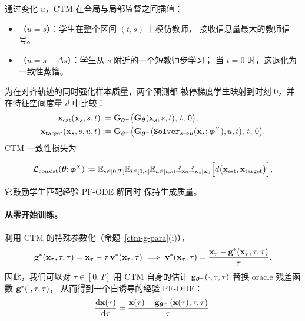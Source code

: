 通过变化 $u$，CTM 在全局与局部监督之间插值：
\begin{itemize}
    \item {}（$u = s$）：学生在整个区间 $(t,s)$ 上模仿教师，
    接收信息量最大的教师信号。
    \item {}（$u = s - \Delta s$）：学生从 $s$ 附近的一个短教师步学习；
    当 $t=0$ 时，这退化为一致性蒸馏。
\end{itemize}

为在对齐轨迹的同时强化样本质量，两个预测都
被停梯度学生映射到时刻 $0$，并在特征空间度量 $d$ 中比较：
\begin{align*}
{\mathbf{x}}_{\mathrm{est}}({\mathbf{x}}_s,s,t) &:= \mathbf{G}_{\bm{\theta}^-} \big(\mathbf{G}_{\bm{\theta}}({\mathbf{x}}_s,s,t),\, t,\, 0\big),\\
{\mathbf{x}}_{\mathrm{target}}({\mathbf{x}}_s,s,u,t) &:= \mathbf{G}_{\bm{\theta}^-} \big(
\mathbf{G}_{\bm{\theta}^-}(\mathtt{Solver}_{s\to u}({\mathbf{x}}_s;\bm{\phi}^\times), u, t),\, t,\, 0\big).
\end{align*}
CTM 一致性损失为
\begin{mdframed}
    \begin{align}\label{eq:ctm-consist-distill}
\begin{aligned}
\mathcal{L}_{\mathrm{consist}}(\bm{\theta}; \bm{\phi}^\times)
:=
\mathbb{E}_{s \in [0,T]}\mathbb{E}_{t \in [0,s]}\mathbb{E}_{u \in [t,s)}
\mathbb{E}_{{\mathbf{x}}_0}\mathbb{E}_{{\mathbf{x}}_s |{\mathbf{x}}_0}
\Big[ d\big({\mathbf{x}}_{\mathrm{est}}, {\mathbf{x}}_{\mathrm{target}}\big) \Big],
\end{aligned}
\end{align}
\end{mdframed}
它鼓励学生匹配经验 PF-ODE 解同时
保持生成质量。


\paragraph{从零开始训练。}
利用 CTM 的特殊参数化（命题~\ref{ctm-g-para}(i)），
\[
{\mathbf{g}}^*({\mathbf{x}}_\tau, \tau, \tau)
= {\mathbf{x}}_\tau - \tau\,{\mathbf{v}}^*({\mathbf{x}}_\tau,\tau)
 \implies
{\mathbf{v}}^*({\mathbf{x}}_\tau,\tau)
= \frac{{\mathbf{x}}_\tau - {\mathbf{g}}^*({\mathbf{x}}_\tau, \tau, \tau)}{\tau}.
\]
因此，我们可以对 $\tau \in [0,T]$ 用 CTM 自身的估计
${\mathbf{g}}_{\bm{\theta}^-}(\cdot,\tau,\tau)$ 替换 oracle 残差函数
${\mathbf{g}}^*(\cdot,\tau,\tau)$，
从而得到一个自诱导的经验 PF-ODE：
\begin{align}\label{eq:emp-pf-ode-ctm}
\frac{\mathop{}\!\mathrm{d} {\mathbf{x}}(\tau)}{\mathop{}\!\mathrm{d} \tau}
= \frac{{\mathbf{x}}(\tau) - {\mathbf{g}}_{\bm{\theta}^-} \left({\mathbf{x}}(\tau),\tau,\tau\right)}{\tau}.
\end{align}

